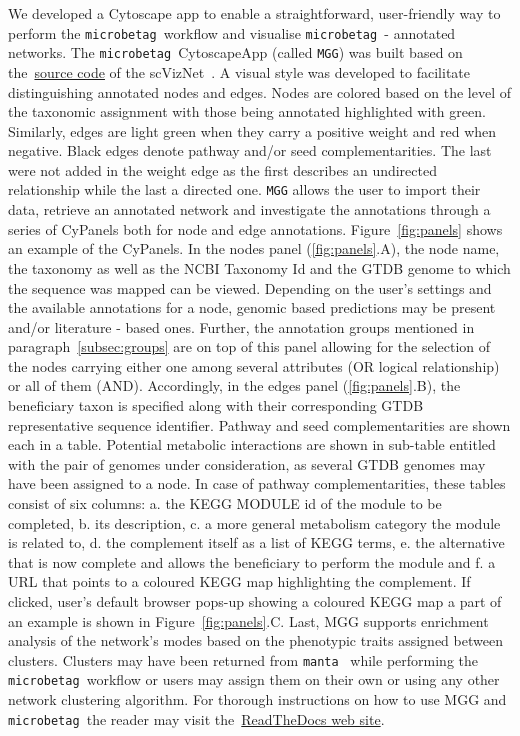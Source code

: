 \documentclass[sn-mathphys,Numbered]{sn-jnl}  %
\theoremstyle{thmstyleone}%
\theoremstyle{thmstyletwo}%
\theoremstyle{thmstylethree}%
\newcommand{\microbetag}{\texttt{microbetag }}
\begin{document}
        We developed a Cytoscape app to enable a straightforward, user-friendly way to perform the \microbetag workflow and visualise \microbetag - annotated networks.
        The \microbetag CytoscapeApp (called \texttt{MGG}) was built based on the~\href{https://github.com/RBVI/scNetViz}{source code} of the scVizNet~\cite{choudhary2021scnetviz}.
        A visual style was developed to facilitate distinguishing annotated nodes and edges.
        Nodes are colored based on the level of the taxonomic assignment with those being annotated highlighted with green.
        Similarly, edges are light green when they carry a positive weight and red when negative. 
        Black edges denote pathway and/or seed complementarities.
        The last were not added in the weight edge as the first describes an undirected relationship while the last a directed one. 
        \texttt{MGG} allows the user to import their data, retrieve an annotated network and investigate the annotations through a series of CyPanels both for node and edge annotations.
        Figure~\ref{fig:panels} shows an example of the CyPanels.
        In the nodes panel (\ref{fig:panels}.A), the node name, the taxonomy as well as the NCBI Taxonomy Id and the GTDB genome to which the sequence was mapped can be viewed. 
        Depending on the user's settings and the available annotations for a node, genomic based predictions may be present and/or literature - based ones.
        Further, the annotation groups mentioned in paragraph~\ref{subsec:groups} are on top of this panel allowing for the selection of the nodes carrying either one among several attributes (OR logical relationship) or all of them (AND).
        Accordingly, in the edges panel (\ref{fig:panels}.B), the beneficiary taxon is specified along with their corresponding GTDB representative sequence identifier.
        Pathway and seed complementarities are shown each in a table.
        Potential metabolic interactions are shown in sub-table entitled with the pair of genomes under consideration, as several GTDB genomes may have been assigned to a node.
        In case of pathway complementarities, these tables consist of six columns: a. the KEGG MODULE id of the module to be completed, b. its description, c. a more general metabolism category the module is related to, d. the complement itself as a list of KEGG terms, e. the alternative that is now complete and allows the beneficiary to perform the module and f. a URL that points to a coloured KEGG map highlighting the complement.
        If clicked, user's default browser pops-up showing a coloured KEGG map a part of an example is shown in Figure~\ref{fig:panels}.C.
        Last, MGG supports enrichment analysis of the network's modes based on the phenotypic traits assigned between clusters. 
        Clusters may have been returned from \texttt{manta}~\cite{rottjers2020manta} while performing the \microbetag workflow or users may assign them on their own or using any other network clustering algorithm.
        For thorough instructions on how to use MGG and \microbetag the reader may visit the~\href{https://hariszaf.github.io/microbetag/docs/cytoApp/}{ReadTheDocs web site}.
\end{document}

